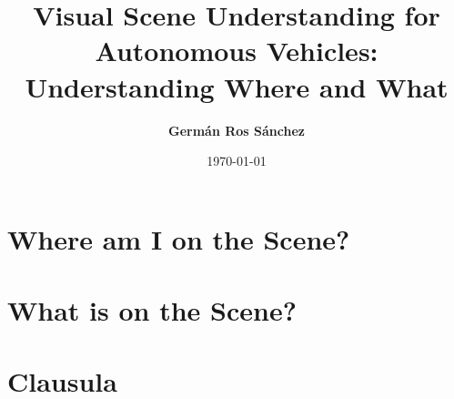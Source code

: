 %
%
%



\title{Visual Scene Understanding for Autonomous Vehicles: Understanding Where and What}
\author{\textbf{Germán Ros Sánchez}}
\date{\today}



\frontmatter
%


\setcounter{page}{0}




\tableofcontents
\cleardoublepage
{}
{} %
\listoffigures
\cleardoublepage
{}
{} %
\listoftables


\setlength{\parskip}{0em}


\mainmatter

  
\def\partimagex{images/part1.eps}
\def\partspacex{-10}
\def\partcapx{Localization and trajectory estimation on a synthetic scene.}
\part{Where am I on the Scene?}



\def\partimagex{images/part2.eps}
\def\partspacex{-50}
\def\partcapx{Semantic segmentation of an outdoor image.}
\part{What is on the Scene?} 



\def\partimagex{images/part3.eps}
\def\partspacex{-90}
\def\partcapx{Pictorial representation of the SYNTHIA virtual world.}
\part{Clausula}


%
\backmatter



